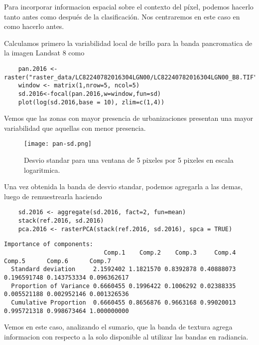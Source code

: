 \begin{exa}
  Para incorporar informacion espacial sobre el contexto del p\'ixel, podemos
  hacerlo tanto antes como despu\'es de la clasificaci\'on. Nos centraremos
  en este caso en como hacerlo antes.

  Calculamos primero la variabilidad local de brillo para la banda pancromatica
  de la imagen Landsat 8 como

  \begin{lstlisting}
    pan.2016 <- raster("raster_data/LC82240782016304LGN00/LC82240782016304LGN00_B8.TIF")
    window <- matrix(1,nrow=5, ncol=5)
    sd.2016<-focal(pan.2016,w=window,fun=sd)
    plot(log(sd.2016,base = 10), zlim=c(1,4))
  \end{lstlisting}

  Vemos que las zonas con mayor presencia de urbanizaciones presentan una mayor variabilidad que aquellas con menor presencia.

  \begin{figure}
    \texttt{[image: pan-sd.png]}
    \caption{Desvio standar para una ventana de 5 pixeles por 5 pixeles en escala logaritmica.}
    \label{fig:pansd}
  \end{figure}

  Una vez obtenida la banda de desvio standar, podemos agregarla a las demas, luego
  de remuestrearla haciendo

  \begin{lstlisting}
    sd.2016 <- aggregate(sd.2016, fact=2, fun=mean)
    stack(ref.2016, sd.2016)
    pca.2016 <- rasterPCA(stack(ref.2016, sd.2016), spca = TRUE)
  \end{lstlisting}

  \begin{Verbatim}[fontsize=\small]
  Importance of components:
                            Comp.1    Comp.2    Comp.3     Comp.4      Comp.5      Comp.6      Comp.7
  Standard deviation     2.1592402 1.1821570 0.8392878 0.40888073 0.196591748 0.143753334 0.096362617
  Proportion of Variance 0.6660455 0.1996422 0.1006292 0.02388335 0.005521188 0.002952146 0.001326536
  Cumulative Proportion  0.6660455 0.8656876 0.9663168 0.99020013 0.995721318 0.998673464 1.000000000
  \end{Verbatim}

  Vemos en este caso, analizando el sumario, que la banda de textura agrega informacion
  con respecto a la solo disponible al utilizar las bandas en radiancia.
\end{exa}

